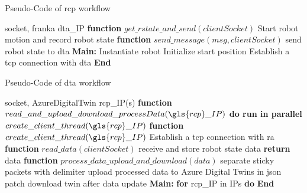 \begin{breakablealgorithm}
    \caption{Pseudo-Code of \gls{rcp} workflow}
    \label{alg:RCPPseudoCode}
    \begin{algorithmic}
     socket, franka
     \gls{dta}\_IP
    \State \textbf{function} {$get\_rstate\_and\_send(clientSocket)$}
        \State \qquad Start robot motion and record robot state
        \State {}
    \State \textbf{function} {$send\_message(msg, clientSocket)$}
        \State \qquad send robot state to \gls{dta} 
    \State \textbf{Main:}
    \State \qquad Instantiate robot
    \State \qquad Initialize start position
    \State \qquad Establish a \gls{tcp} connection with \gls{dta}  
    \State {}
    \State \textbf{End}
    \end{algorithmic}
\end{breakablealgorithm}


\begin{breakablealgorithm}
    \caption{Pseudo-Code of \gls{dta} workflow}
    \label{alg:DTAgentPseudoCode}
    \begin{algorithmic}
     socket, AzureDigitalTwin
     \gls{rcp}\_IP(s)
    \State \textbf{function} {$read\_and\_upload\_download\_processData(\gls{rcp}\_IP)$}
        \State \qquad \textbf{do run in parallel}
            \State \qquad \qquad $create\_client\_thread(\gls{rcp}\_IP)$       
    \State \textbf{function} {$create\_client\_thread(\gls{rcp}\_IP)$}
        \State \qquad Establish a \gls{tcp} connection with \gls{ra}
        \State {}  
        \State {}    
    \State \textbf{function} {$read\_data(clientSocket)$}
        \State \qquad receive and store robot state data
        \State \qquad \textbf{return} data
    \State \textbf{function} {$process\_data\_upload\_and\_download(data)$}
        \State \qquad separate sticky packets with delimiter
        \State \qquad upload processed data to Azure Digital Twins in json patch
        \State \qquad download twin after data update 
    \State \textbf{Main:}
        \State \qquad \textbf{for} \gls{rcp}\_IP in IPs \textbf{do}
        \State \qquad {}
        \State \textbf{End}
    \end{algorithmic}
\end{breakablealgorithm}



